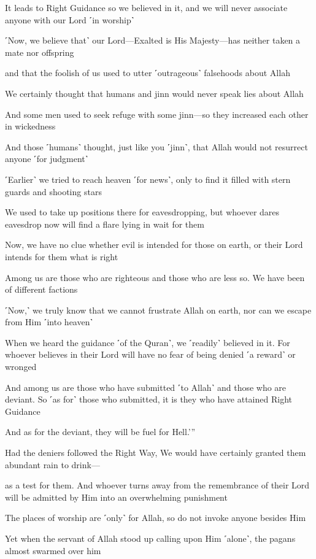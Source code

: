 It leads to Right Guidance so we believed in it, and we will never associate anyone with our Lord ˹in worship˺

˹Now, we believe that˺ our Lord—Exalted is His Majesty—has neither taken a mate nor offspring

and that the foolish of us used to utter ˹outrageous˺ falsehoods about Allah

We certainly thought that humans and jinn would never speak lies about Allah

And some men used to seek refuge with some jinn—so they increased each other in wickedness

And those ˹humans˺ thought, just like you ˹jinn˺, that Allah would not resurrect anyone ˹for judgment˺

˹Earlier˺ we tried to reach heaven ˹for news˺, only to find it filled with stern guards and shooting stars

We used to take up positions there for eavesdropping, but whoever dares eavesdrop now will find a flare lying in wait for them

Now, we have no clue whether evil is intended for those on earth, or their Lord intends for them what is right

Among us are those who are righteous and those who are less so. We have been of different factions

˹Now,˺ we truly know that we cannot frustrate Allah on earth, nor can we escape from Him ˹into heaven˺

When we heard the guidance ˹of the Quran˺, we ˹readily˺ believed in it. For whoever believes in their Lord will have no fear of being denied ˹a reward˺ or wronged

And among us are those who have submitted ˹to Allah˺ and those who are deviant. So ˹as for˺ those who submitted, it is they who have attained Right Guidance

And as for the deviant, they will be fuel for Hell.’”

Had the deniers followed the Right Way, We would have certainly granted them abundant rain to drink—

as a test for them. And whoever turns away from the remembrance of their Lord will be admitted by Him into an overwhelming punishment

The places of worship are ˹only˺ for Allah, so do not invoke anyone besides Him

Yet when the servant of Allah stood up calling upon Him ˹alone˺, the pagans almost swarmed over him


